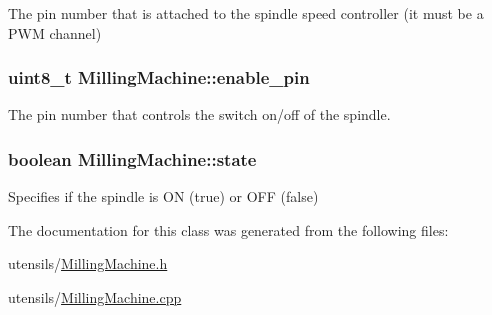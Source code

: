 The pin number that is attached to the spindle speed controller (it must be a P\+W\+M channel) 

\hypertarget{class_milling_machine_a129e02eb0a1b612587fd0175a413cfdd}{
\subsubsection[{enable\+\_\+pin}]{\setlength{\rightskip}{0pt plus 5cm}uint8\+\_\+t Milling\+Machine\+::enable\+\_\+pin\hspace{0.3cm}{\ttfamily [private]}}}\label{class_milling_machine_a129e02eb0a1b612587fd0175a413cfdd}


The pin number that controls the switch on/off of the spindle. 

\hypertarget{class_milling_machine_a8d46b3e3c141e9402a2729b61550babb}{
\subsubsection[{state}]{\setlength{\rightskip}{0pt plus 5cm}boolean Milling\+Machine\+::state\hspace{0.3cm}{\ttfamily [private]}}}\label{class_milling_machine_a8d46b3e3c141e9402a2729b61550babb}


Specifies if the spindle is O\+N (true) or O\+F\+F (false) 



The documentation for this class was generated from the following files\+:\begin{DoxyCompactItemize}
\item 
utensils/\hyperlink{_milling_machine_8h}{Milling\+Machine.\+h}\item 
utensils/\hyperlink{_milling_machine_8cpp}{Milling\+Machine.\+cpp}\end{DoxyCompactItemize}
